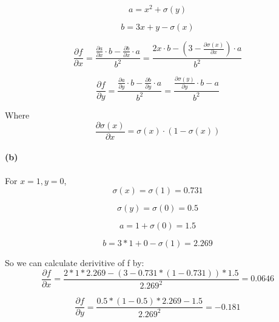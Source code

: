 \documentclass{article}
\begin{document}
\begin{equation}
a = x^2 + \sigma{(y)}
\end{equation}

\begin{equation}
b = 3x + y - \sigma{(x)}
\end{equation}

\begin{equation}
\frac{\partial f}{\partial x} 
= \frac{\frac{\partial a}{\partial x} \cdot b - \frac{\partial b}{\partial x} \cdot a }{b^2}  
= \frac{2x \cdot b - (3 - \frac{\partial \sigma{(x)}}{\partial x}) \cdot a}{b^2}
\end{equation}

\begin{equation}
\frac{\partial f}{\partial y} 
= \frac{\frac{\partial a}{\partial y} \cdot b - \frac{\partial b}{\partial y} \cdot a }{b^2} 
= \frac{\frac{\partial \sigma{(y)}}{\partial y} \cdot b - a}{b^2}
\end{equation}

Where 
\begin{equation}
\frac{\partial \sigma{(x)}}{\partial x} = \sigma{(x)} \cdot {(1-\sigma{(x)})}
\end{equation}

\paragraph{(b)}
For $x = 1, y = 0$,
\begin{equation}
\sigma{(x)} = \sigma{(1)} = 0.731
\end{equation}

\begin{equation}
\sigma{(y)} = \sigma{(0)} = 0.5
\end{equation}

\begin{equation}
a = 1 + \sigma{(0)} = 1.5
\end{equation}

\begin{equation}
b = 3*1 + 0 - \sigma{(1)} = 2.269
\end{equation}

So we can calculate derivitive of f by:
\begin{equation}
\frac{\partial f}{\partial x} = \frac{2*1*2.269-(3-0.731*(1-0.731))*1.5}{2.269^2} = 0.0646
\end{equation}

\begin{equation}
\frac{\partial f}{\partial y} = \frac{0.5*(1-0.5)*2.269-1.5}{2.269^2} = -0.181
\end{equation}
\end{document}
